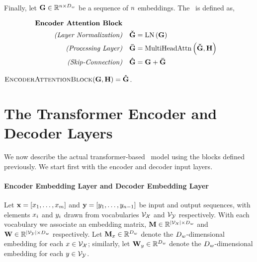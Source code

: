~\\

           \noindent Finally, let $\mathbf{G} \in \mathbb{R}^{n \times D_{w}}$ be a sequence of $n$ embeddings. The \encoderattentionblock~is
           defined as,\\
    {\centering \begin{minipage}{0.9\textwidth}
   \begin{align*}
       \textbf{Encoder Attention Block} & \\
       \textit{(Layer Normalization)} & & 
            \boldsymbol{\check{\mathbf{G}}} &
            =  \operatorname{LN}\left(\mathbf{G}\right) \\
            \textit{(Processing Layer)} &  & \boldsymbol{\bar{\mathbf{G}}} &=  \operatorname{MultiHeadAttn}\left(\boldsymbol{\check{\mathbf{G}}}, \mathbf{H}\right)  \\
        \textit{(Skip-Connection)} & & \boldsymbol{\hat{\mathbf{G}}} &= \mathbf{G} + \boldsymbol{\bar{\mathbf{G}}}\end{align*}
       \begin{center}  {$\textsc{EncoderAttentionBlock}(\mathbf{G}, \mathbf{H}) =  {\boldsymbol{\hat{\mathbf{G}}}}$.}\end{center}
\end{minipage}}



\section{The Transformer Encoder and Decoder Layers}

We now describe the actual transformer-based \sequencetosequence~model
using the blocks defined previously. We start first with the encoder 
and decoder input layers.


\paragraph{{Encoder Embedding Layer} and {Decoder Embedding Layer}}
           Let $\mathbf{x} = \left[ x_1,\ldots,x_{m}\right]$ and 
           $\mathbf{y} = \left[y_1,\ldots,y_{n-1}\right]$ be 
           input and output sequences, with elements $x_i$ and $y_i$
           drawn from vocabularies $\mathcal{V}_{\mathcal{X}}$ and $\mathcal{V}_{\mathcal{Y}}$ respectively.
           With each vocabulary we associate an embedding matrix,
          $\mathbf{M} \in \mathbb{R}^{{\left\vert \mathcal{V}_{\mathcal{X}} \right\vert} \times D_{w}}$ 
          and 
          $\mathbf{W} \in \mathbb{R}^{{\left\vert \mathcal{V}_{\mathcal{Y}} \right\vert} \times D_{w}}$ 
          respectively. Let $\mathbf{M}_{x} \in \mathbb{R}^{D_{w}}$ denote the $D_{w}$-dimensional  embedding for each $x \in \mathcal{V}_{\mathcal{X}}$; similarly,  
let $\mathbf{W}_y \in \mathbb{R}^{D_{w}}$ denote the $D_{w}$-dimensional  embedding for each $y \in \mathcal{V}_{\mathcal{Y}}$.

